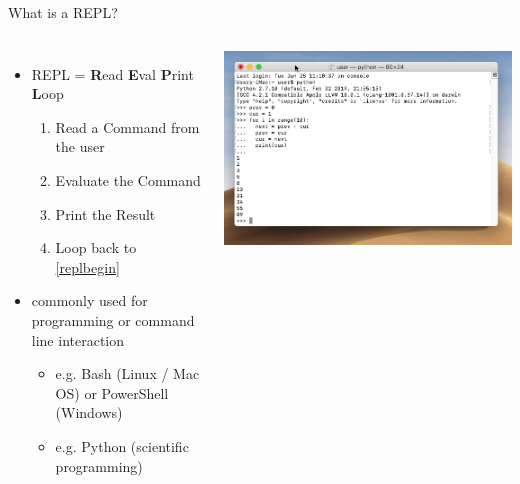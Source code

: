 \documentclass{beamer}
\begin{document}
    \begin{frame}{What is a REPL?}
        \begin{columns}
            \begin{itemize}
                \item REPL = \textbf{R}ead \textbf{E}val \textbf{P}rint \textbf{L}oop
                \begin{enumerate}
                    \item\label{replbegin} Read a Command from the user
                    \item Evaluate the Command
                    \item Print the Result
                    \item Loop back to \ref{replbegin}
                \end{enumerate}
                \item commonly used for programming or command line interaction
                \begin{itemize}
                    \item e.g. Bash (Linux / Mac OS) or PowerShell (Windows)
                    \item e.g. Python (scientific programming)
                \end{itemize}
            \end{itemize}
            \includegraphics[scale=0.25]{images/repl}
        \end{columns}
    \end{frame}
\end{document}
